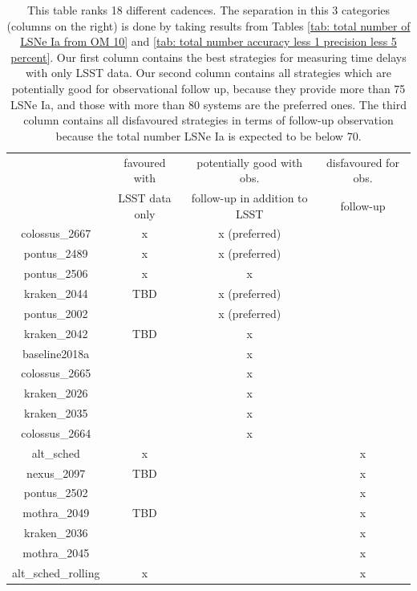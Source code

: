 \begin{table}
\centering
\begin{tabular}{c|c|c|c}
& favoured with  & potentially good with obs. & disfavoured for  obs. \\
& LSST data only &  follow-up in addition to LSST & follow-up\\
\hline
colossus\_2667 & x & x (preferred) & \\
\hline
pontus\_2489 & x & x (preferred) & \\
\hline
pontus\_2506 & x & x \\
\hline
kraken\_2044 & TBD & x (preferred) & \\
\hline
pontus\_2002 & & x (preferred) &   \\
\hline
kraken\_2042 & TBD & x & \\
\hline
baseline2018a & & x &    \\
\hline
colossus\_2665 & & x &   \\
\hline
kraken\_2026 & & x & \\
\hline
kraken\_2035 & & x &    \\
\hline
colossus\_2664 & & x &   \\
\hline
alt\_sched & x  & & x \\
\hline
nexus\_2097 & TBD  & & x  \\
\hline
pontus\_2502 &&  &x  \\
\hline
mothra\_2049 & TBD & & x  \\
\hline
kraken\_2036 & & & x  \\
\hline
mothra\_2045 & & & x  \\
\hline
alt\_sched\_rolling & x & & x  \\
\end{tabular}
\caption{This table ranks 18 different cadences. The separation in
  this 3 categories (columns on the right) is done by taking results
  from Tables \ref{tab: total number of LSNe Ia from OM 10} and
  \ref{tab: total number accuracy less 1 precision less 5
    percent}. Our first column contains the best strategies for
  measuring time delays with only LSST data. Our second column
  contains all strategies which are potentially good for observational
  follow up, because they provide more than 75 LSNe Ia, and those with
  more than 80 systems are the preferred ones. The third column
  contains all disfavoured strategies in terms of follow-up
  observation because the total number LSNe Ia is expected to be below 70. }
\label{tab: favoured strategies}
\end{table}
%
\FloatBarrier
